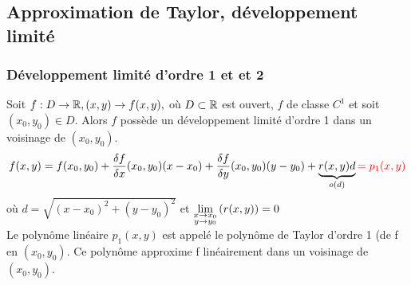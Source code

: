 \documentclass[12pt,a4paper]{article}
\begin{document}
\subsection{Approximation de Taylor, développement limité}
\subsubsection{Développement limité d'ordre 1 et et 2}
Soit $f: D \to \mathbb{R}, (x,y) \to f(x,y),$ où $D \subset \mathbb{R}$ est ouvert, $f$ de classe $C^1$ et soit $(x_0,y_0) \in D$. Alors $f$ possède un développement limité d'ordre 1 dans un voisinage de $(x_0,y_0)$. 
\begin{equation*}
f(x,y) = f(x_0,y_0) + \frac{\delta f}{\delta x}(x_0,y_0)(x-x_0) + \frac{\delta f}{\delta y}(x_0,y_0)(y-y_0) + \underbrace{r(x,y) d}_{o(d)} \textcolor{red}{= p_1(x,y)}
\end{equation*}
où $d = \sqrt{(x-x_0)^2 + (y-y_0)^2}$ et $\lim\limits_{\substack{x\to x_0 \\ y\to y_0}}\left(r(x,y)\right) = 0$\\
Le polynôme linéaire $p_1(x,y)$ est appelé le polynôme de Taylor d'ordre 1 (de f en $(x_0,y_0)$. Ce polynôme approxime f linéairement dans un voisinage de $(x_0,y_0)$.
\end{document}

